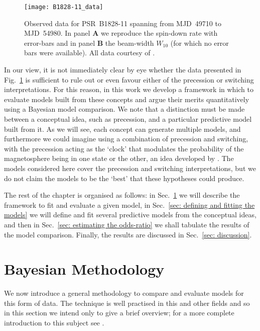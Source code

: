 \documentclass[../full_thesis/full_thesis.tex]{subfiles}
\begin{document}
\begin{figure}
\centering
\texttt{[image: B1828-11\_data]}
\caption{Observed data for PSR~B1828-11 spanning from MJD~49710 to MJD~54980.
         In panel $\textbf{A}$ we reproduce the spin-down rate with error-bars
         and in panel $\textbf{B}$ the beam-width $W_{10}$
          (for which no error bars were available). All data
         courtesy of \citet{Lyne2010}.}
\label{fig: B1828-11 data}
\end{figure}

In our view, it is not immediately clear by eye whether the data presented in
Fig.~\ref{fig: B1828-11 data} is sufficient to rule out or even favour either
of the precession or switching interpretations.  For this reason, in this work
we develop a framework in which to evaluate models built from these concepts
and argue their merits quantitatively using a Bayesian model comparison. We
note that a distinction must be made between a conceptual idea, such as
precession, and a particular predictive model built from it. As we will see,
each concept can generate multiple models, and furthermore we could imagine
using a combination of precession and switching,  with the precession acting as
the `clock' that modulates the probability of the magnetosphere being in one
state or the other, an idea developed by  \citet{Jones2012}. The models
considered here cover the precession and switching interpretations, but we do
not claim the models to be the `best' that these hypotheses could produce.

The rest of the chapter is organised as follows: in Sec.~\ref{sec: methodology} we
will describe the framework to fit and evaluate a given model, in
Sec.~\ref{sec: defining and fitting the models} we will define and fit several
predictive models from the conceptual ideas, and then in Sec.~\ref{sec:
estimating the odds-ratio} we shall tabulate the results of the model
comparison. Finally, the results are discussed in Sec.~\ref{sec: discussion}.





\section{ Bayesian Methodology}
\label{sec: methodology}
We now introduce a general methodology to compare and evaluate models for this
form of data. The technique is well practised in this and other fields and so
in this section we intend only to give a brief overview; for a more complete
introduction to this subject see \cite{jaynes2003probability,
gelman2013bayesian, sivia1996data}.
\end{document}
